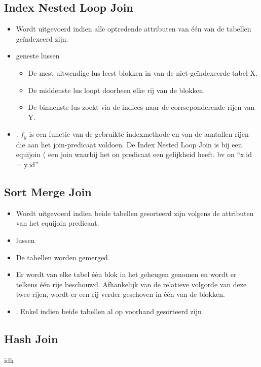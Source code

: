 \documentclass{article}
\begin{document}
\subsection{Index Nested Loop Join}
\begin{itemize}
	\item {Wordt uitgevoerd indien alle optredende attributen van één van de tabellen geïndexeerd zijn.}
	\item { geneste lussen
		\begin{itemize}
			\item{De mest uitwendige lus leest blokken in van de niet-geïndexeerde tabel X.}
			\item {De middenste lus loopt doorheen elke rij van de blokken.}
			\item {De binnenste lus zoekt via de indices naar de corrseponderende rijen van Y.}
		\end{itemize}
	}
	\item {. $f_y$ is een functie van de gebruikte indexmethode en van de aantallen rijen die aan het join-predicaat voldoen. De Index Nested Loop Join is bij een equijoin ( een join waarbij het on predicaat een gelijkheid heeft. bv on ``x.id = y.id'' }
\end{itemize}

\subsection{Sort Merge Join}
\begin{itemize}
	\item {Wordt uitgevoerd indien beide tabellen gesorteerd zijn volgens de attributen van het equijoin predicaat.}
	\item { lussen}
	\item {De tabellen worden gemerged.}
	\item {Er wordt van elke tabel één blok in het geheugen genomen en wordt er telkens één rije beschouwd. Afhankelijk van de relatieve volgorde van deze twee rijen, wordt er een rij verder geschoven in één van de blokken.}
	\item {. Enkel indien beide tabellen al op voorhand gesorteerd zijn}
\end{itemize}

\subsection{Hash Join}
idk
\end{document}
